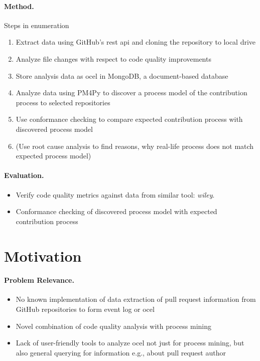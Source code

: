 \paragraph{Method.} Steps in enumeration
\begin{enumerate}
	\item Extract data using GitHub's \ac{rest api} and cloning the repository to local drive
	\item Analyze file changes with respect to code quality improvements
	\item Store analysis data as \ac{ocel} in MongoDB, a document-based database
	\item Analyze data using PM4Py to discover a process model of the contribution process to selected repositories
	\item Use conformance checking to compare expected contribution process with discovered process model
	\item (Use root cause analysis to find reasons, why real-life process does not match expected process model)
\end{enumerate}

\paragraph{Evaluation.} 
\begin{itemize}
	\item Verify code quality metrics against data from similar tool: \emph{wiley}.
	\item Conformance checking of discovered process model with expected contribution process
\end{itemize} 

\section{Motivation}
\label{sec:intro_ssec:motiv}
\paragraph{Problem Relevance.} 
\begin{itemize}
	\item No known implementation of data extraction of pull request information from GitHub repositories to form event log or \ac{ocel}
	\item Novel combination of code quality analysis with process mining
	\item Lack of user-friendly tools to analyze \ac{ocel} not just for process mining, but also general querying for information e.g., about pull request author
\end{itemize}

